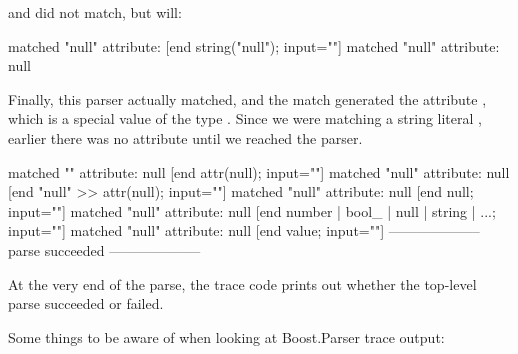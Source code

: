 \documentclass{MyBook}
\begin{document}
 and  did not match, but  will:

\begin{code}
[begin null; input="null"]
  [begin "null" >> attr(null); input="null"]
    [begin "null"; input="null"]
      [begin string("null"); input="null"]
        matched "null"
        attribute:
      [end string("null"); input=""]
      matched "null"
      attribute: null
\end{code}

Finally, this parser actually matched, and the match generated the attribute , which is a special value of the type . Since we were matching a string literal , earlier there was no attribute until we reached the  parser.

\begin{code}
        [end "null"; input=""]
        [begin attr(null); input=""]
          matched ""
          attribute: null
        [end attr(null); input=""]
        matched "null"
        attribute: null
      [end "null" >> attr(null); input=""]
      matched "null"
      attribute: null
    [end null; input=""]
    matched "null"
    attribute: null
  [end number | bool_ | null | string | ...; input=""]
  matched "null"
  attribute: null
[end value; input=""]
--------------------
parse succeeded
--------------------
\end{code}

At the very end of the parse, the trace code prints out whether the top-level parse succeeded or failed.

Some things to be aware of when looking at Boost.Parser trace output:
\end{document}
